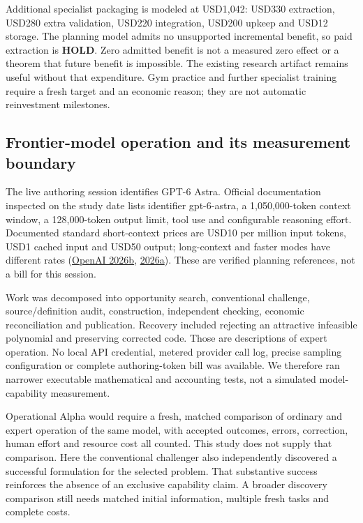 \documentclass[11pt,a4paper]{article}
\renewcommand{\texttt}[1]{{\ttfamily\small #1}}
\begin{document}
Additional specialist packaging is modeled at USD1,042: USD330
extraction, USD280 extra validation, USD220 integration, USD200 upkeep
and USD12 storage. The planning model admits no unsupported incremental
benefit, so paid extraction is \textbf{HOLD}. Zero admitted benefit is
not a measured zero effect or a theorem that future benefit is
impossible. The existing research artifact remains useful without that
expenditure. Gym practice and further specialist training require a
fresh target and an economic reason; they are not automatic reinvestment
milestones.


\hypertarget{frontier-model-operation-and-its-measurement-boundary}{%
\subsection{Frontier-model operation and its measurement
boundary}\label{frontier-model-operation-and-its-measurement-boundary}}

The live authoring session identifies GPT-6 Astra. Official
documentation inspected on the study date lists identifier
\texttt{gpt-6-astra}, a 1,050,000-token context window, a 128,000-token
output limit, tool use and configurable reasoning effort. Documented
standard short-context prices are USD10 per million input tokens, USD1
cached input and USD50 output; long-context and faster modes have
different rates (\protect\hyperlink{ref-openai2026model}{OpenAI 2026b},
\protect\hyperlink{ref-openai2026pricing}{2026a}). These are verified
planning references, not a bill for this session.

Work was decomposed into opportunity search, conventional challenge,
source/definition audit, construction, independent checking, economic
reconciliation and publication. Recovery included rejecting an
attractive infeasible polynomial and preserving corrected code. Those
are descriptions of expert operation. No local API credential, metered
provider call log, precise sampling configuration or complete
authoring-token bill was available. We therefore ran narrower executable
mathematical and accounting tests, not a simulated model-capability
measurement.

Operational Alpha would require a fresh, matched comparison of ordinary
and expert operation of the same model, with accepted outcomes, errors,
correction, human effort and resource cost all counted. This study does
not supply that comparison. Here the conventional challenger also
independently discovered a successful formulation for the selected
problem. That substantive success reinforces the absence of an exclusive
capability claim. A broader discovery comparison still needs matched
initial information, multiple fresh tasks and complete costs.
\end{document}
